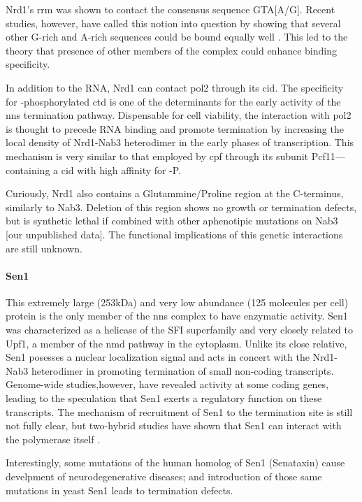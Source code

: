 Nrd1's \gls{rrm} was shown \invivo{} to contact the consensus sequence GTA[A/G].
Recent \invitro{} studies, however, have called this notion into question by showing that several other G-rich and A-rich sequences could be bound equally well \cite{bacikova:2014:structure}.
This led to the theory that presence of other members of the complex could enhance binding specificity.

In addition to the RNA, Nrd1 can contact \gls{pol2} through its \gls{cid}. 
The specificity for \serf{}-phosphorylated \gls{ctd} is one of the determinants for the early activity of the \gls{nns} termination pathway. 
Dispensable for cell viability, the interaction with \gls{pol2} is thought to precede RNA binding and promote termination by increasing the local density of Nrd1-Nab3 heterodimer in the early phases of transcription.
This mechanism is very similar to that employed by \gls{cpf} through its subunit Pcf11---containing a \gls{cid} with high affinity for \sert{}-P.
 
Curiously, Nrd1 also contains a Glutammine/Proline region at the C-terminus, similarly to Nab3. 
Deletion of this region shows no growth or termination defects, but is synthetic lethal if combined with other aphenotipic mutations on Nab3 [our unpublished data].
The functional implications of this genetic interactions are still unknown. 

\paragraph{Sen1}

This extremely large (253kDa) and very low abundance (125 molecules per cell) protein is the only member of the \gls{nns} complex to have enzymatic activity.
Sen1 was characterized as a helicase of the SFI superfamily and very closely related to Upf1, a member of the \gls{nmd} pathway in the cytoplasm.
Unlike its close relative, Sen1 posesses a nuclear localization signal and acts in concert with the Nrd1-Nab3 heterodimer in promoting termination of small non-coding transcripts.
Genome-wide studies,however, have revealed activity at some coding genes, leading to the speculation that Sen1 exerts a regulatory function on these transcripts. 
The mechanism of recruitment of Sen1 to the termination site is still not fully clear, but two-hybrid studies have shown that Sen1 can interact with the polymerase itself . 

Interestingly, some mutations of the human homolog of Sen1 (Senataxin) cause develpment of neurodegenerative diseases; and introduction of those same mutations in yeast Sen1 leads to termination defects.

